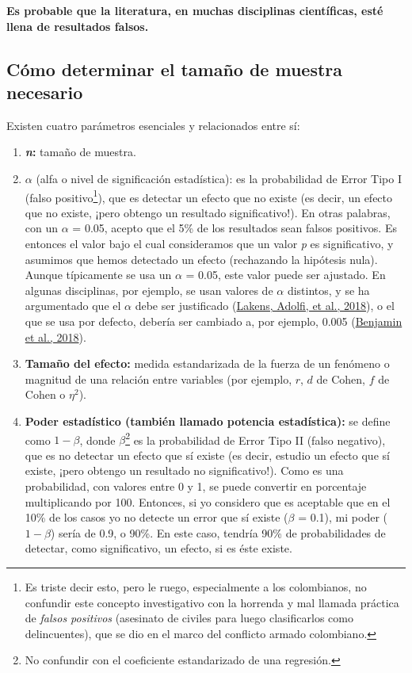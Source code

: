 \documentclass[
]{article}
\providecommand{\tightlist}{%
  \setlength{\itemsep}{0pt}\setlength{\parskip}{0pt}}
\begin{document}
\textcolor{red}{\faBookmark} \textbf{Es probable que la literatura, en
muchas disciplinas científicas, esté llena de resultados falsos.}

\hypertarget{cuxf3mo-determinar-el-tamauxf1o-de-muestra-necesario}{%
\subsection{Cómo determinar el tamaño de muestra
necesario}\label{cuxf3mo-determinar-el-tamauxf1o-de-muestra-necesario}}

Existen cuatro parámetros esenciales y relacionados entre sí:

\begin{enumerate}
\def\labelenumi{\arabic{enumi}.}
\tightlist
\item
  \textbf{\emph{n}:} tamaño de muestra.
\item
  \(\alpha\) (alfa o nivel de significación estadística): es la
  probabilidad de Error Tipo I (falso positivo\footnote{Es triste decir
    esto, pero le ruego, especialmente a los colombianos, no confundir
    este concepto investigativo con la horrenda y mal llamada práctica
    de \emph{falsos positivos} (asesinato de civiles para luego
    clasificarlos como delincuentes), que se dio en el marco del
    conflicto armado colombiano.}), que es detectar un efecto que no
  existe (es decir, un efecto que no existe, ¡pero obtengo un resultado
  significativo!). En otras palabras, con un \(\alpha\) = 0.05, acepto
  que el 5\% de los resultados sean falsos positivos. Es entonces el
  valor bajo el cual consideramos que un valor \emph{p} es
  significativo, y asumimos que hemos detectado un efecto (rechazando la
  hipótesis nula). Aunque típicamente se usa un \(\alpha\) = 0.05, este
  valor puede ser ajustado. En algunas disciplinas, por ejemplo, se usan
  valores de \(\alpha\) distintos, y se ha argumentado que el \(\alpha\)
  debe ser justificado
  (\protect\hyperlink{ref-lakensJustifyYourAlpha2018}{Lakens, Adolfi, et
  al., 2018}), o el que se usa por defecto, debería ser cambiado a, por
  ejemplo, 0.005
  (\protect\hyperlink{ref-benjaminRedefineStatisticalSignificance2018}{Benjamin
  et al., 2018}).
\item
  \textbf{Tamaño del efecto:} medida estandarizada de la fuerza de un
  fenómeno o magnitud de una relación entre variables (por ejemplo,
  \(r\), \(d\) de Cohen, \(f\) de Cohen o \(\eta^2\)).
\item
  \textbf{Poder estadístico (también llamado potencia estadística):} se
  define como \(1-\beta\), donde \(\beta\)\footnote{No confundir con el
    coeficiente estandarizado de una regresión.} es la probabilidad de
  Error Tipo II (falso negativo), que es no detectar un efecto que sí
  existe (es decir, estudio un efecto que sí existe, ¡pero obtengo un
  resultado no significativo!). Como es una probabilidad, con valores
  entre 0 y 1, se puede convertir en porcentaje multiplicando por 100.
  Entonces, si yo considero que es aceptable que en el 10\% de los casos
  yo no detecte un error que sí existe (\(\beta\) = 0.1), mi poder
  (\(1-\beta\)) sería de 0.9, o 90\%. En este caso, tendría 90\% de
  probabilidades de detectar, como significativo, un efecto, si es éste
  existe.
\end{enumerate}
\end{document}
